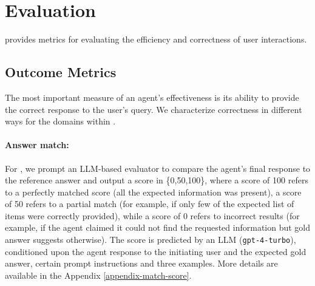 \section{Evaluation}

\asyncfw{} provides metrics for evaluating the efficiency and correctness of user interactions. 


\subsection{Outcome Metrics}

The most important measure of an agent's effectiveness is its ability to provide the correct response to the user's query. We characterize correctness in different ways for the  domains within \asyncfw{}.

\paragraph{Answer match:} For \dataspider{}, we prompt an LLM-based evaluator to compare the agent's final response to the reference answer and output a score in \{0,50,100\}, where a score of 100 refers to a perfectly matched score (all the expected information was present), a score of 50 refers to a partial match (for example, if only few of the expected list of items were correctly provided), while a score of 0 refers to incorrect results (for example, if the agent claimed it could not find the requested information but gold answer suggests otherwise).  
The score is predicted by an LLM (\texttt{gpt-4-turbo}), conditioned upon the agent response to the initiating user and the expected gold answer, certain prompt instructions and three examples. More details are available in the Appendix \ref{appendix-match-score}. 

